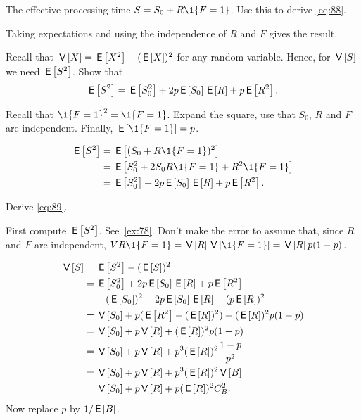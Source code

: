 \begin{exercise}\label{ex:l-256}
 The effective processing time $S = S_{0} + R \1{F=1}$.  Use this to
derive \cref{eq:88}.
\begin{solution}
Taking expectations and using the independence of $R$ and $F$ gives the result.
\end{solution}
\end{exercise}

\begin{exercise}\label{ex:78}
Recall that $\V X = \E{X^2} - (\E X)^{2}$ for any random variable. Hence, for $\V S$ we need $\E{S^{2}}$.   Show that
 \begin{equation*}
 \E{S^2} = \E{S_0^2} + 2 p \E{S_0} \E R + p \E{R^2}.
 \end{equation*}
 \begin{hint}
 Recall that $\1{F=1}^2= \1{F=1}$. Expand the square, use that $S_0$, $R$ and $F$ are independent. Finally, $\E{\1{F=1}} = p$.
 \end{hint}
\begin{solution}

 \begin{align*}
 \E{S^2}
&= \E{(S_0+R\1{F=1})^{2}} \\
&=\E{S_0^2 + 2 S_0 R \1{F=1} + R^2\1{F=1}} \\
&=  \E{S_0^2} + 2 p \E{S_0} \E R + p \E{R^2}.
 \end{align*}
\end{solution}
\end{exercise}

\begin{exercise}\label{ex:l-257}
Derive \cref{eq:89}.
\begin{hint}
 First compute $\E{S^2}$. See~\cref{ex:78}. Don't make the error to assume that,  since $R$ and $F$ are independent,  $V{R\1{F=1}} = \V R \V{\1{F=1}} = \V R p (1-p)$.
\end{hint}
\begin{solution}
 \begin{equation*}
 \begin{split}
\V{S}
&=\E{S^2} - (\E{S})^2 \\
&= \E{S_0^2} + 2 p \E{S_0} \E R + p \E{R^2} \\
&\quad - (\E{S_0})^2 - 2p \E{S_0}\E R - (p \E R)^2\\
&= \V{S_0} + p(\E{R^2} - (\E R)^2) + (\E R)^2p (1-p) \\
&= \V{S_0} + p\V R + (\E R)^2p (1-p) \\
&= \V{S_0} + p\V R + p^3 (\E R)^2\frac{1-p}{p^2} \\
&= \V{S_0} + p\V R + p^3 (\E R)^2 \V B\\
&= \V{S_0} + p\V R + p (\E R)^2 C^2_B.
 \end{split}
 \end{equation*}
 Now replace $p$ by $1/\E B$.
\end{solution}
\end{exercise}




